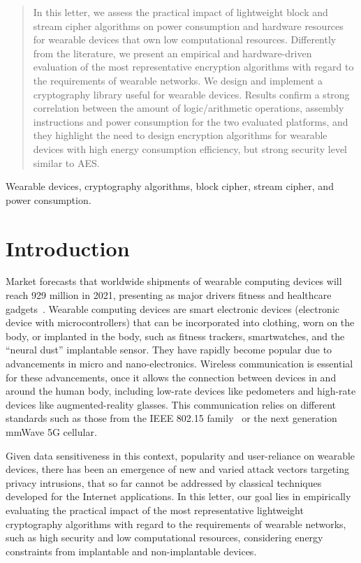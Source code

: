 \documentclass[journal]{IEEEtran}
\begin{document}
\begin{abstract}
In this letter, we assess the practical impact of lightweight block and stream cipher algorithms on power consumption and hardware resources for wearable devices that own low computational resources. Differently from the literature, we present an empirical and hardware-driven evaluation of the most representative encryption algorithms with regard to the requirements of wearable networks. We design and implement a cryptography library useful for wearable devices. Results confirm a strong correlation between the amount of logic/arithmetic operations, assembly instructions and power consumption for the two evaluated platforms, and they highlight the need to design encryption algorithms for wearable devices with high energy consumption efficiency, but strong security level similar to AES. 
\end{abstract}
\vspace{-0.3cm}
\begin{IEEEkeywords}
Wearable devices, cryptography algorithms, block cipher, stream cipher, and power consumption. 
\vspace{-0.1cm}
\end{IEEEkeywords}

\IEEEpeerreviewmaketitle

\vspace{-0.1cm}
\section{Introduction}
Market forecasts that worldwide shipments of wearable computing devices will reach 929 million in 2021, presenting as major drivers fitness and healthcare gadgets~\cite{cheung2018emerging}. Wearable computing devices are smart electronic devices (electronic device with microcontrollers) that can be incorporated into clothing, worn on the body, or implanted in the body, such as fitness trackers, smartwatches, and the ``neural dust'' implantable sensor. They have rapidly become popular due to advancements in micro and nano-electronics. Wireless communication is essential for these advancements, once it allows the connection between devices in and around the human body, including low-rate devices like pedometers and high-rate devices like augmented-reality glasses. This communication relies on different standards such as those from the IEEE 802.15 family~\cite{Li:2018} or the next generation mmWave 5G cellular. 

 Given data sensitiveness in this context, popularity and user-reliance on wearable devices, there has been an emergence of new and varied attack vectors targeting privacy intrusions, that so far cannot be addressed by classical techniques developed for the Internet applications.  In this letter, our goal lies in empirically evaluating the practical impact of the most representative lightweight cryptography algorithms with regard to the requirements of wearable networks, such as high security and low computational resources, considering energy constraints from implantable and non-implantable devices. 
 
\end{document}
